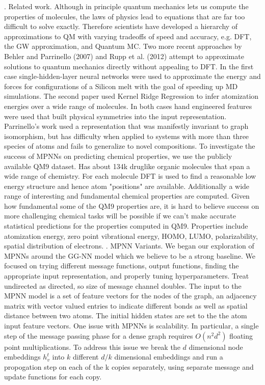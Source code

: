 \documentclass[12pt,reqno]{amsart}
\numberwithin{equation}{section}
\begin{document}
\begin{enumerate}
. Related work.  Although in principle quantum mechanics lets us compute the properties of molecules, the laws of physics lead to equations that are far too difficult to solve exactly.  Therefore scientists have developed a hierarchy of approximations to QM with varying tradeoffs of speed and accuracy, e.g. DFT, the GW approximation, and Quantum MC.  Two more recent approaches by Behler and Parrinello (2007) and Rupp et al. (2012) attempt to approximate solutions to quantum mechanics directly without appealing to DFT.  In the first case single-hidden-layer neural networks were used to approximate the energy and forces for configurations of a Silicon melt with the goal of speeding up MD simulations.  The second paper used Kernel Ridge Regression to infer atomization energies over a wide range of molecules.  In both cases hand engineered features were used that built physical symmetries into the input representation.  Parrinello's work used a representation that was manifestly invariant to graph isomorphism, but has difficulty when applied to systems with more than three species of atoms and fails to generalize to novel compositions.  
\subitem To investigate the success of MPNNs on predicting chemical properties, we use the publicly available QM9 dataset.  Has about 134k druglike organic molecules that span a wide range of chemistry.  For each molecule DFT is used to find a reasonable low energy structure and hence atom "positions" are available.  Additionally a wide range of interesting and fundamental chemical properties are computed.  Given how fundamental some of the QM9 properties are, it is hard to believe success on more challenging chemical tasks will be possible if we can't make accurate statistical predictions for the properties computed in QM9.  Properties include atomization energy, zero point vibrational energy, HOMO, LUMO, polarizability, spatial distribution of electrons.  
.  MPNN Variants.  We began our exploration of MPNNs around the GG-NN model which we believe to be a strong baseline.  We focused on trying different message functions, output functions, finding the appropriate input representation, and properly tuning hyperparameters.  Treat undirected as directed, so size of message channel doubles.  The input to the MPNN model is a set of feature vectors for the nodes of the graph, an adjacency matrix with vector valued entries to indicate different bonds as well as spatial distance between two atoms.  The initial hidden states are set to the the atom input feature vectors.  One issue with MPNNs is scalability.  In particular, a single step of the message passing phase for a dense graph requires $O(n^2d^2)$ floating point multiplications.  To address this issue we break the $d$ dimensional node embeddings $h_v^t$ into $k$ different $d/k$ dimensional embeddings and run a propogation step on each of the k copies separately, using separate message and update functions for each copy.  

\end{enumerate}
\end{document}
